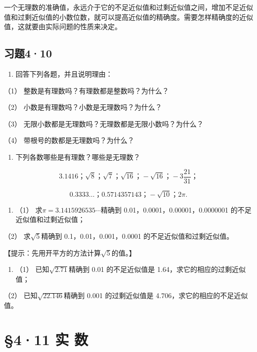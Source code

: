 一个无理数的准确值，永远介于它的不足近似值和过剩近似值之间，增加不足近似值和过剩近似值的小数位数，就可以提高近似值的精确度。需要怎样精确度的近似值，这就要由实际问题的性质来决定。

\subsection{习题4·10}

\begin{enumerate}
\item
  回答下列各题，并且说明理由：
\end{enumerate}

（1） 整数是有理数吗？有理数都是整数吗？为什么？

（2） 小数是有理数吗？小数是无理数吗？为什么？

（3） 无限小数都是无理数吗？无理数都是无限小数吗？为什么？

（4） 带根号的数都是无理数吗？为什么？

\begin{enumerate}[start=2]
\item
  下列各数哪些是有理数？哪些是无理数？
\end{enumerate}

\[
3.1416\text{；} \sqrt {8}\text{；} \sqrt {7}\text{；} \sqrt {16}\text{；} - \sqrt {16}\text{；} - 3 \frac{21}{31}\text{；}
\]

\[
0.3333 \dots \text{；} 0.5714357143\text{；} - \sqrt {10}\text{；} 2 \pi .
\]

\begin{enumerate}[start=3]
\item
  （1） 求\(\pi = 3.1415926535\cdots\)精确到
  0.01，0.0001，0.00001，0.0000001 的不足近似值和过剩近似值；
\end{enumerate}

（2） 求\(\sqrt{5}\)精确到 0.1，0.01，0.001，0.0001
的不足近似值和过剩近似值。

【提示：先用开平方的方法计算\(\sqrt{5}\)的值。】

\begin{enumerate}[start=4]
\item
  （1） 已知\(\sqrt{2.71}\)精确到 0.01 的不足近似值是
  1.64，求它的相应的过剩近似值；
\end{enumerate}

（2） 已知\(\sqrt{22.146}\)精确到 0.001 的过剩近似值是
4.706，求它的相应的不足近似值。

\section{§4·11 实 数}

